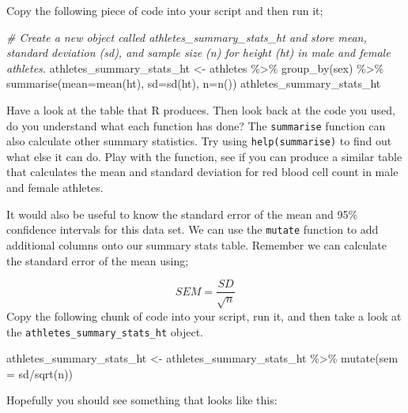 \documentclass[
]{book}
\newenvironment{Shaded}{\begin{snugshade}}{\end{snugshade}}
\newcommand{\AttributeTok}[1]{\textcolor[rgb]{0.77,0.63,0.00}{#1}}
\newcommand{\CommentTok}[1]{\textcolor[rgb]{0.56,0.35,0.01}{\textit{#1}}}
\newcommand{\FunctionTok}[1]{\textcolor[rgb]{0.00,0.00,0.00}{#1}}
\newcommand{\NormalTok}[1]{#1}
\newcommand{\OtherTok}[1]{\textcolor[rgb]{0.56,0.35,0.01}{#1}}
\newcommand{\SpecialCharTok}[1]{\textcolor[rgb]{0.00,0.00,0.00}{#1}}
\begin{document}
Copy the following piece of code into your script and then run it;

\begin{Shaded}
\begin{Highlighting}[]
\CommentTok{\# Create a new object called athletes\_summary\_stats\_ht and store mean, standard deviation (sd), and sample size (n) for height (ht) in male and female athletes.}
\NormalTok{athletes\_summary\_stats\_ht }\OtherTok{\textless{}{-}}\NormalTok{ athletes }\SpecialCharTok{\%\textgreater{}\%} 
  \FunctionTok{group\_by}\NormalTok{(sex) }\SpecialCharTok{\%\textgreater{}\%} 
  \FunctionTok{summarise}\NormalTok{(}\AttributeTok{mean=}\FunctionTok{mean}\NormalTok{(ht),}
            \AttributeTok{sd=}\FunctionTok{sd}\NormalTok{(ht),}
            \AttributeTok{n=}\FunctionTok{n}\NormalTok{())}
\NormalTok{athletes\_summary\_stats\_ht}
\end{Highlighting}
\end{Shaded}

Have a look at the table that R produces. Then look back at the code you used, do you understand what each function has done? The \texttt{summarise} function can also calculate other summary statistics. Try using \texttt{help(summarise)} to find out what else it can do. Play with the function, see if you can produce a similar table that calculates the mean and standard deviation for red blood cell count in male and female athletes.

It would also be useful to know the standard error of the mean and 95\% confidence intervals for this data set. We can use the \texttt{mutate} function to add additional columns onto our summary stats table. Remember we can calculate the standard error of the mean using;

\[
SEM = \frac{SD}{\sqrt{n}}
\]
Copy the following chunk of code into your script, run it, and then take a look at the \texttt{athletes\_summary\_stats\_ht} object.

\begin{Shaded}
\begin{Highlighting}[]
\NormalTok{athletes\_summary\_stats\_ht }\OtherTok{\textless{}{-}}\NormalTok{ athletes\_summary\_stats\_ht }\SpecialCharTok{\%\textgreater{}\%}
  \FunctionTok{mutate}\NormalTok{(}\AttributeTok{sem =}\NormalTok{ sd}\SpecialCharTok{/}\FunctionTok{sqrt}\NormalTok{(n))}
\end{Highlighting}
\end{Shaded}

Hopefully you should see something that looks like this:
\end{document}
